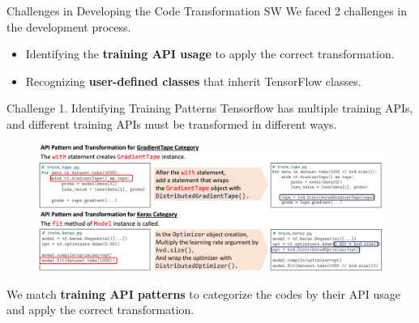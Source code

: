 \documentclass{beamer}
\begin{document}
\begin{frame}{Challenges in Developing the Code Transformation SW}
  We faced 2 challenges in the development process.
  \begin{itemize}
    \item Identifying the \textbf{training API usage} to apply the correct transformation. 
    \item Recognizing \textbf{user-defined classes} that inherit TensorFlow classes.
  \end{itemize} 
\end{frame}

\begin{frame}{Challenge 1. Identifying Training Patterns}
  Tensorflow has multiple training APIs, and 
  different training APIs must be transformed in different ways.

  \begin{figure}
    \includegraphics[width=\textwidth]{patternex} 
  \end{figure}
  {\footnotesize
    We match \textbf{training API patterns} to categorize the codes
    by their API usage and apply the correct transformation. 
  }
\end{frame}
\end{document}
